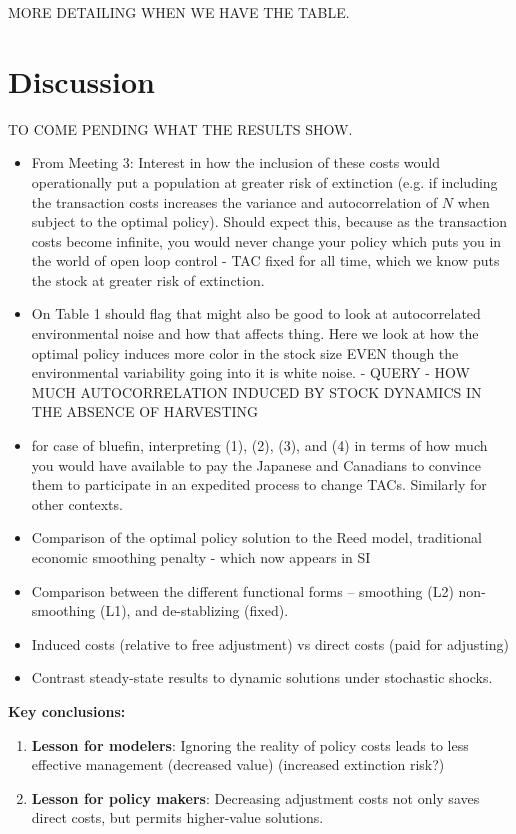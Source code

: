 \documentclass[12pt]{article}
\begin{document}
MORE DETAILING WHEN WE HAVE THE TABLE.

\section{Discussion}
TO COME PENDING WHAT THE RESULTS SHOW.
\begin{itemize}
\item From Meeting 3: Interest in how the inclusion of these costs would operationally put a population at greater risk of extinction (e.g. if including the transaction costs increases the variance and autocorrelation of $N$ when subject to the optimal policy). Should expect this, because as the transaction costs become infinite, you would never change your policy which puts you in the world of open loop control - TAC fixed for all time, which we know puts the stock at greater risk of extinction.
\item On Table 1 should flag that might also be good to look at autocorrelated environmental noise and how that affects thing. Here we look at how the optimal policy induces more color in the stock size EVEN though the environmental variability going into it is white noise. - QUERY - HOW MUCH AUTOCORRELATION INDUCED BY STOCK DYNAMICS IN THE ABSENCE OF HARVESTING
\item for case of bluefin, interpreting  (1), (2), (3), and (4) in terms of how much you would have available to pay the Japanese and Canadians to convince them to participate in an expedited process to change TACs. Similarly for other contexts.
\item   Comparison of the optimal policy solution to the Reed model, traditional economic smoothing penalty - which now appears in SI
\item  Comparison between the different functional forms -- smoothing (L2)
  non-smoothing (L1), and de-stablizing (fixed).
\item   Induced costs (relative to free adjustment) vs direct costs (paid for adjusting) 
\item   Contrast steady-state results to dynamic solutions under stochastic shocks.
\end{itemize}

\textbf{Key conclusions:}
\begin{enumerate}
  \item \textbf{Lesson for modelers}: Ignoring the reality of policy costs leads to less effective management (decreased value)  (increased extinction risk?)
  \item \textbf{Lesson for policy makers}: Decreasing adjustment costs not only saves direct costs, but permits higher-value solutions.
\end{enumerate}
\end{document}
